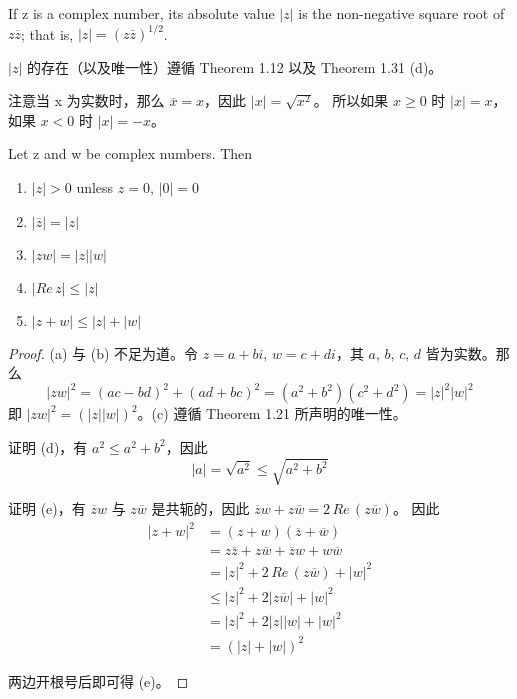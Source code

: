 \documentclass[../poma-note.tex]{subfiles}
\begin{document}
\begin{definition}
	If z is a complex number, its absolute value $|z|$ is the non-negative square root of $z\overline{z}$;
	that is, $|z| = (z\overline{z})^{1/2}$.
\end{definition}

$|z|$ 的存在（以及唯一性）遵循 Theorem 1.12 以及 Theorem 1.31 (d)。

注意当 x 为实数时，那么 $\overline{x} = x$，因此 $|x| = \sqrt{x^2}$。
所以如果 $x \ge 0$ 时 $|x| = x$，如果 $x<0$ 时 $|x| = -x$。

\begin{theorem}
	Let z and w be complex numbers. Then
	\begin{enumerate}[label=(\alph*)]
		\item $|z|>0$ unless $z=0,\,|0|=0$
		\item $|\overline{z}|=|z|$
		\item $|zw|=|z||w|$
		\item $|Re \, z| \le |z|$
		\item $|z+w| \le |z|+|w|$
	\end{enumerate}
\end{theorem}

\begin{proof}
	(a) 与 (b) 不足为道。令 $z=a+bi,\,w=c+di$，其 $a,\,b,\,c,\,d$ 皆为实数。那么
	\[|zw|^2 = (ac-bd)^2 + (ad+bc)^2 = (a^2+b^2)(c^2+d^2) = |z|^2|w|^2\]
	即 $|zw|^2 = (|z||w|)^2$。(c) 遵循 Theorem 1.21 所声明的唯一性。

	证明 (d)，有 $a^2 \le a^2 + b^2$，因此
	\[|a| = \sqrt{a^2} \le \sqrt{a^2 + b^2}\]

	证明 (e)，有 $\overline{z}w$ 与 $z\overline{w}$ 是共轭的，因此 $\overline{z}w + z\overline{w} = 2\, Re\,(z\overline{w})$。
	因此
	\begin{align*}
		\mathcal |z+w|^2 & = (z+w)(\overline{z}+\overline{w})                              \\
		                 & = z\overline{z} + z\overline{w} + \overline{z}w + w\overline{w} \\
		                 & = |z|^2 + 2\,Re\,(z\overline{w}) + |w|^2                        \\
		                 & \le |z|^2 + 2|z\overline{w}| + |w|^2                            \\
		                 & = |z|^2 + 2|z||w| + |w|^2                                       \\
		                 & = (|z|+|w|)^2
	\end{align*}

	两边开根号后即可得 (e)。
\end{proof}
\end{document}
